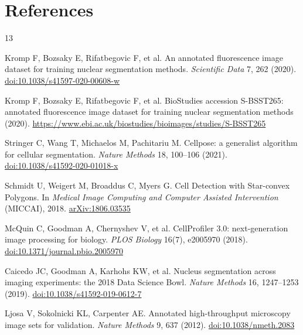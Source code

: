 \documentclass[10pt,a4paper,twocolumn]{article}
\begin{document}
\section{References}
\scriptsize
\begin{thebibliography}{13}
\setlength{\itemsep}{0.2ex}
\setlength{\parskip}{0pt}

Kromp F, Bozsaky E, Rifatbegovic F, et al.
\newblock An annotated fluorescence image dataset for training nuclear segmentation methods.
\newblock \emph{Scientific Data} 7, 262 (2020).
\newblock \href{https://doi.org/10.1038/s41597-020-00608-w}{doi:10.1038/s41597-020-00608-w}

Kromp F, Bozsaky E, Rifatbegovic F, et al.
\newblock BioStudies accession S-BSST265: annotated fluorescence image dataset for training nuclear segmentation methods (2020).
\newblock \url{https://www.ebi.ac.uk/biostudies/bioimages/studies/S-BSST265}

Stringer C, Wang T, Michaelos M, Pachitariu M.
\newblock Cellpose: a generalist algorithm for cellular segmentation.
\newblock \emph{Nature Methods} 18, 100--106 (2021).
\newblock \href{https://doi.org/10.1038/s41592-020-01018-x}{doi:10.1038/s41592-020-01018-x}

Schmidt U, Weigert M, Broaddus C, Myers G.
\newblock Cell Detection with Star-convex Polygons.
\newblock In \emph{Medical Image Computing and Computer Assisted Intervention} (MICCAI), 2018.
\newblock \href{https://arxiv.org/abs/1806.03535}{arXiv:1806.03535}

McQuin C, Goodman A, Chernyshev V, et al.
\newblock CellProfiler 3.0: next-generation image processing for biology.
\newblock \emph{PLOS Biology} 16(7), e2005970 (2018).
\newblock \href{https://doi.org/10.1371/journal.pbio.2005970}{doi:10.1371/journal.pbio.2005970}

Caicedo JC, Goodman A, Karhohs KW, et al.
\newblock Nucleus segmentation across imaging experiments: the 2018 Data Science Bowl.
\newblock \emph{Nature Methods} 16, 1247--1253 (2019).
\newblock \href{https://doi.org/10.1038/s41592-019-0612-7}{doi:10.1038/s41592-019-0612-7}

Ljosa V, Sokolnicki KL, Carpenter AE.
\newblock Annotated high-throughput microscopy image sets for validation.
\newblock \emph{Nature Methods} 9, 637 (2012).
\newblock \href{https://doi.org/10.1038/nmeth.2083}{doi:10.1038/nmeth.2083}


\end{thebibliography}
\end{document}
